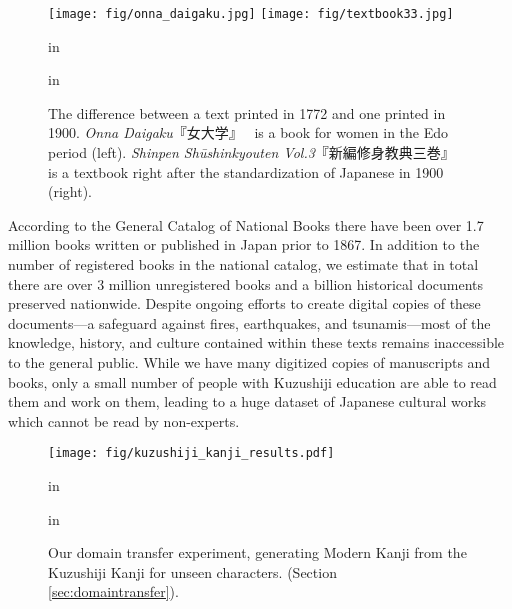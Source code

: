 \documentclass{article}
\begin{document}
\begin{CJK}{UTF8}{min}
\begin{figure}[!htb]
\vskip -0.15in
\begin{center}
\centerline{\texttt{[image: fig/onna\_daigaku.jpg]}
\hspace{3mm}
\texttt{[image: fig/textbook33.jpg]}}
 in
\caption{The difference between a text printed in 1772 and one printed in 1900. \textit{Onna Daigaku}『女大学』~\cite{textbook_edo} is a book for women in the Edo period (left). \textit{Shinpen Shūshinkyouten Vol.3}『新編修身教典三巻』~\cite{textbook_meiji33} is a textbook right after the standardization of Japanese in 1900 (right).}
\label{fig:textbook}
\end{center}
 in
\end{figure}

According to the General Catalog of National Books \cite{national_catalog} there have been over 1.7 million books written or published in Japan prior to 1867. In addition to the number of registered books in the national catalog, we estimate that in total there are over 3 million unregistered books and a billion historical documents preserved nationwide. Despite ongoing efforts to create digital copies of these documents—a safeguard against fires, earthquakes, and tsunamis—most of the knowledge, history, and culture contained within these texts remains inaccessible to the general public. While we have many digitized copies of manuscripts and books, only a small number of people with Kuzushiji education are able to read them and work on them, leading to a huge dataset of Japanese cultural works which cannot be read by non-experts.

\begin{figure}[!htb]
\vskip -0.05in
\begin{center}
\centerline{\texttt{[image: fig/kuzushiji\_kanji\_results.pdf]}}
 in
\caption{Our domain transfer experiment, generating Modern Kanji from the Kuzushiji Kanji for unseen characters. (Section \ref{sec:domaintransfer}).}
\label{fig:kuzushijikanji}
\end{center}
 in
\end{figure}


\end{CJK}
\end{document}
